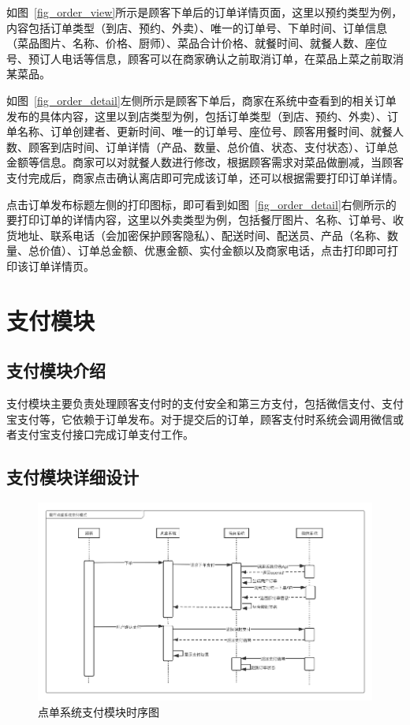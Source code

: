 如图~\ref{fig_order_view}所示是顾客下单后的订单详情页面，这里以预约类型为例，内容包括订单类型（到店、预约、外卖）、唯一的订单号、下单时间、订单信息（菜品图片、名称、价格、厨师）、菜品合计价格、就餐时间、就餐人数、座位号、预订人电话等信息，顾客可以在商家确认之前取消订单，在菜品上菜之前取消某菜品。

如图~\ref{fig_order_detail}左侧所示是顾客下单后，商家在系统中查看到的相关订单发布的具体内容，这里以到店类型为例，包括订单类型（到店、预约、外卖）、订单名称、订单创建者、更新时间、唯一的订单号、座位号、顾客用餐时间、就餐人数、顾客到店时间、订单详情（产品、数量、总价值、状态、支付状态）、订单总金额等信息。商家可以对就餐人数进行修改，根据顾客需求对菜品做删减，当顾客支付完成后，商家点击确认离店即可完成该订单，还可以根据需要打印订单详情。

点击订单发布标题左侧的打印图标，即可看到如图~\ref{fig_order_detail}右侧所示的要打印订单的详情内容，这里以外卖类型为例，包括餐厅图片、名称、订单号、收货地址、联系电话（会加密保护顾客隐私）、配送时间、配送员、产品（名称、数量、总价值）、订单总金额、优惠金额、实付金额以及商家电话，点击打印即可打印该订单详情页。\\


\section{支付模块}
\subsection{支付模块介绍}
支付模块主要负责处理顾客支付时的支付安全和第三方支付，包括微信支付、支付宝支付等，它依赖于订单发布。对于提交后的订单，顾客支付时系统会调用微信或者支付宝支付接口完成订单支付工作。\\

\subsection{支付模块详细设计}
\begin{figure}[htbp!]
    \centering
    \includegraphics[width=5in]{FIGs/chapter4/pay_time.pdf}
    \caption{点单系统支付模块时序图}\label{fig_pay_time}
\end{figure}

